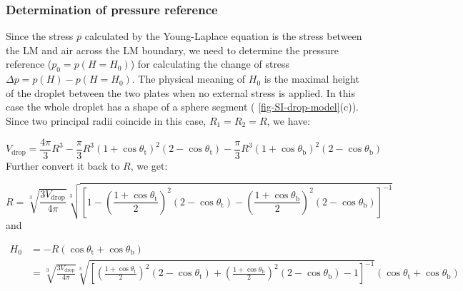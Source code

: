 \subsubsection{Determination of pressure reference}
\label{sec:small-orgdade735}
Since the stress \(p\) calculated by the Young-Laplace equation is
the stress between the LM and air across the LM boundary, we need
to determine the pressure reference (\(p_{0} = p(H=H_{0})\)) for
calculating the change of stress \(\Delta p=p(H) - p(H=H_{0})\). The
physical meaning of \(H_{0}\) is the maximal height of the droplet
between the two plates when no external stress is applied. In this
case the whole droplet has a shape of a sphere segment (
\autoref{fig-SI-drop-model}(c)). Since two principal radii coincide in this
case, \(R_{1}=R_{2}=R\), we have:

\begin{equation}
\label{eq:small-5}
V_{\mathrm{drop}} = \frac{4 \pi}{3} R^{3} - \frac{\pi}{3} R^{3} (1 + \cos \theta_{\mathrm{t}})^{2}(2 - \cos \theta_{\mathrm{t}})
                                          - \frac{\pi}{3} R^{3} (1 + \cos \theta_{\mathrm{b}})^{2}(2 - \cos \theta_{\mathrm{b}})
\end{equation}
Further convert it back to \(R\), we get:

\begin{equation}
\label{eq:small-8}
R = \sqrt[3]{\frac{3 V_{\mathrm{drop}}}{4 \pi}} \sqrt[3]{\left[ 
1 - \left(\frac{1 + \cos \theta_{\mathrm{t}}}{2} \right)^{2} \left(2 - \cos \theta_{\mathrm{t}}\right)
- \left(\frac{1 + \cos \theta_{\mathrm{b}}}{2} \right)^{2} \left(2 - \cos \theta_{\mathrm{b}}\right)
\right]^{-1}}
\end{equation}
and

 \begin{equation}
 \label{eq:small-9}
 \begin{aligned}
 H_{0} &= -R(\cos \theta_{\mathrm{t}} + \cos \theta_{\mathrm{b}})  \\
 &= \sqrt[3]{\frac{3 V_{\mathrm{drop}}}{4 \pi}} \sqrt[3]{\left[ 
\left(\frac{1 + \cos \theta_{\mathrm{t}}}{2} \right)^{2} \left(2 - \cos \theta_{\mathrm{t}}\right) +
 \left(\frac{1 + \cos \theta_{\mathrm{b}}}{2} \right)^{2} \left(2 - \cos \theta_{\mathrm{b}}\right) -1 
 \right]^{-1}}  \left(\cos \theta_{\mathrm{t}} + \cos \theta_{\mathrm{b}}\right)
 \end{aligned}
\end{equation}



